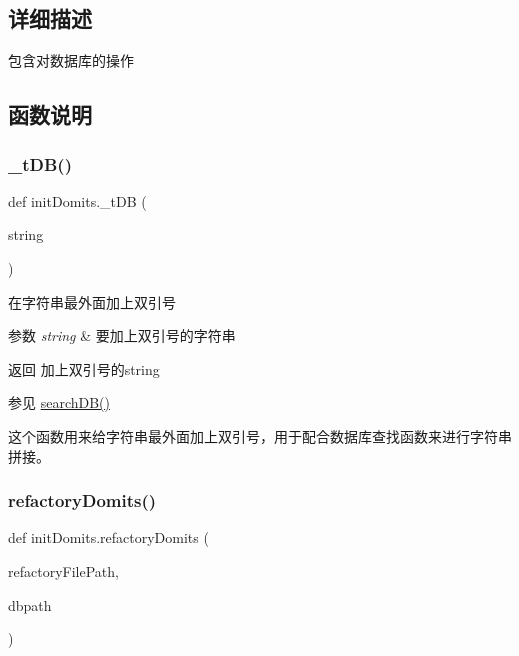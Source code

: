 \subsection{详细描述}
包含对数据库的操作 



\subsection{函数说明}
\mbox{\label{group___xE6_x95_xB0_xE6_x8D_xAE_xE5_xBA_x93_xE6_x93_x8D_xE4_xBD_x9C_gab6a167211fea45f940088aa25e470456}} 
\subsubsection{\texorpdfstring{\_tDB()}{\_tDB()}}
{\footnotesize\ttfamily def init\+Domits.\+\_\+t\+DB (\begin{DoxyParamCaption}\item[{}]{string }\end{DoxyParamCaption})\hspace{0.3cm}{\ttfamily [private]}}



在字符串最外面加上双引号 


\begin{DoxyParams}{参数}
{\em string} & 要加上双引号的字符串 \\
\hline
\end{DoxyParams}
\begin{DoxyReturn}{返回}
加上双引号的string 
\end{DoxyReturn}
\begin{DoxySeeAlso}{参见}
\mbox{\hyperlink{group___xE6_x95_xB0_xE6_x8D_xAE_xE5_xBA_x93_xE6_x93_x8D_xE4_xBD_x9C_gab0b2210b38aa2decfc4f09e122f949bf}{search\+D\+B()}}
\end{DoxySeeAlso}
这个函数用来给字符串最外面加上双引号，用于配合数据库查找函数来进行字符串拼接。 \mbox{\label{group___xE6_x95_xB0_xE6_x8D_xAE_xE5_xBA_x93_xE6_x93_x8D_xE4_xBD_x9C_ga7cf18932eaa3e3b83f60132e1de06e82}} 
\subsubsection{\texorpdfstring{refactoryDomits()}{refactoryDomits()}}
{\footnotesize\ttfamily def init\+Domits.\+refactory\+Domits (\begin{DoxyParamCaption}\item[{}]{refactory\+File\+Path,  }\item[{}]{dbpath }\end{DoxyParamCaption})}



